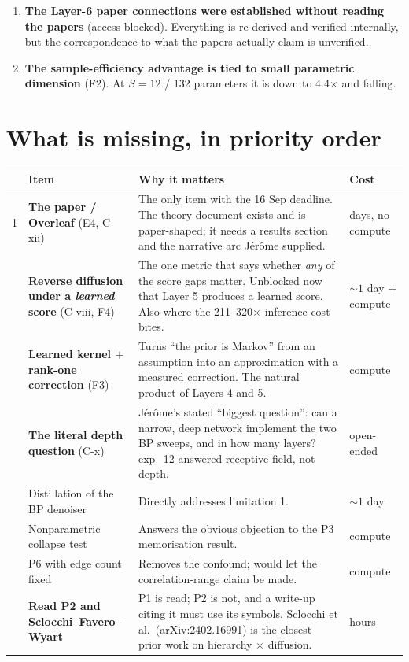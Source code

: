 \documentclass[11pt,a4paper]{article}
\begin{document}
\begin{enumerate}
\item \textbf{The Layer-6 paper connections were established without reading the papers}
(access blocked). Everything is re-derived and verified internally, but the correspondence to
what the papers actually claim is unverified.

\item \textbf{The sample-efficiency advantage is tied to small parametric dimension} (F2). At
$S=12$ / 132 parameters it is down to 4.4$\times$ and falling.
\end{enumerate}

\newpage
\section{What is missing, in priority order}
\label{sec:missing}

\begin{center}
\begin{tabular}{@{}p{0.6cm}p{5.4cm}p{6.4cm}p{2.6cm}@{}}
\toprule
& \textbf{Item} & \textbf{Why it matters} & \textbf{Cost} \\
\midrule
1 & \textbf{The paper / Overleaf} (E4, C-xii) & The only item with the 16 Sep deadline. The
theory document exists and is paper-shaped; it needs a results section and the narrative arc
J\'er\^ome supplied. & days, no compute \\
\addlinespace
2 & \textbf{Reverse diffusion under a \emph{learned} score} (C-viii, F4) & The one metric that
says whether \emph{any} of the score gaps matter. Unblocked now that Layer 5 produces a
learned score. Also where the 211--320$\times$ inference cost bites. & ${\sim}1$ day $+$ compute \\
\addlinespace
3 & \textbf{Learned kernel $+$ rank-one correction} (F3) & Turns ``the prior is Markov'' from
an assumption into an approximation with a measured correction. The natural product of Layers
4 and 5. & compute \\
\addlinespace
4 & \textbf{The literal depth question} (C-x) & J\'er\^ome's stated ``biggest question'': can
a narrow, deep network implement the two BP sweeps, and in how many layers? exp\_12 answered
receptive field, not depth. & open-ended \\
\addlinespace
5 & Distillation of the BP denoiser & Directly addresses limitation 1. & ${\sim}1$ day \\
\addlinespace
6 & Nonparametric collapse test & Answers the obvious objection to the P3 memorisation result. & compute \\
\addlinespace
7 & P6 with edge count fixed & Removes the confound; would let the correlation-range claim be
made. & compute \\
\addlinespace
8 & \textbf{Read P2 and Sclocchi--Favero--Wyart} & P1 is read; P2 is not, and a write-up
citing it must use its symbols. Sclocchi et al.\ (arXiv:2402.16991) is the closest prior work
on hierarchy $\times$ diffusion. & hours \\
\bottomrule
\end{tabular}
\end{center}
\end{document}
